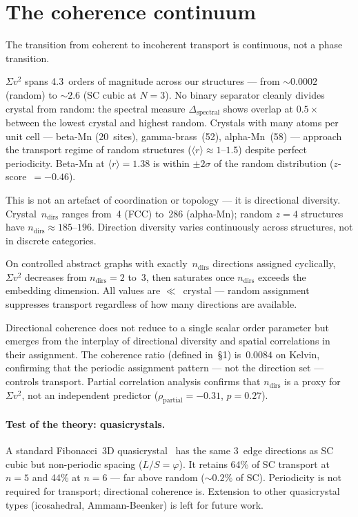\documentclass[12pt]{article}
\newcommand{\mr}{\langle r \rangle}
\newcommand{\svtwo}{\Sigma v^2}
\begin{document}
\section{The coherence continuum}

The transition from coherent to incoherent transport is continuous, not a
phase transition.

$\svtwo$ spans 4.3~orders of magnitude across our structures --- from
$\sim 0.0002$ (random) to $\sim 2.6$ (SC cubic at $N = 3$).  No binary
separator cleanly divides crystal from random: the spectral measure
$\Delta_{\mathrm{spectral}}$ shows overlap at $0.5\times$ between the lowest
crystal and highest random.  Crystals with many atoms per unit cell ---
beta-Mn (20~sites), gamma-brass~(52), alpha-Mn~(58) --- approach the
transport regime of random structures ($\mr \approx 1$--$1.5$) despite
perfect periodicity.  Beta-Mn at $\mr = 1.38$ is within $\pm 2\sigma$ of the
random distribution ($z$-score~$= -0.46$).

This is not an artefact of coordination or topology --- it is directional
diversity.  Crystal~$n_{\mathrm{dirs}}$ ranges from~4 (FCC) to~286
(alpha-Mn); random $z=4$ structures have
$n_{\mathrm{dirs}} \approx 185$--$196$.  Direction diversity varies
continuously across structures, not in discrete categories.

On controlled abstract graphs with exactly~$n_{\mathrm{dirs}}$ directions
assigned cyclically, $\svtwo$ decreases from $n_{\mathrm{dirs}} = 2$ to~3,
then saturates once $n_{\mathrm{dirs}}$ exceeds the embedding dimension.  All
values are $\ll$~crystal --- random assignment suppresses transport regardless
of how many directions are available.

Directional coherence does not reduce to a single scalar order parameter but
emerges from the interplay of directional diversity and spatial correlations
in their assignment.  The coherence ratio (defined in~\S1) is~$0.0084$ on
Kelvin, confirming that the periodic assignment pattern --- not the direction
set --- controls transport.  Partial correlation analysis confirms that
$n_{\mathrm{dirs}}$ is a proxy for~$\svtwo$, not an independent predictor
($\rho_{\mathrm{partial}} = -0.31$, $p = 0.27$).

\paragraph{Test of the theory: quasicrystals.}
A standard Fibonacci~3D quasicrystal~\cite{kohmoto83} has the same 3~edge
directions as SC cubic but non-periodic spacing ($L/S = \varphi$).  It
retains 64\% of SC transport at $n = 5$ and 44\% at $n = 6$ --- far above
random ($\sim 0.2\%$ of SC).  Periodicity is not required for transport;
directional coherence is.  Extension to other quasicrystal types
(icosahedral, Ammann-Beenker) is left for future work.
\end{document}
